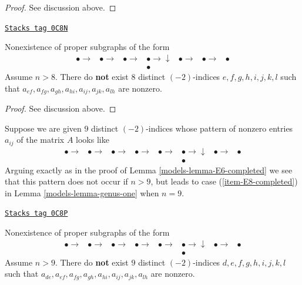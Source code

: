 \begin{proof}
See discussion above.
\end{proof}

\begin{lemma}[E7 completed]
\label{models-lemma-E7-completed}
\href{https://stacks.math.columbia.edu/tag/0C8N}{\texttt{Stacks tag 0C8N}}

Nonexistence of proper subgraphs of the form
$$
\begin{array}{ccccccc}\bullet \longrightarrow & \bullet \longrightarrow & \bullet \longrightarrow & \bullet \longrightarrow\downarrow & \bullet \longrightarrow & \bullet \longrightarrow & \bullet \\  &  &  & \bullet &  &  & \end{array}
$$
Assume $n > 8$. There do {\bf not} exist $8$ distinct
$(-2)$-indices $e, f, g, h, i, j, k, l$
such that $a_{ef}, a_{fg}, a_{gh}, a_{hi}, a_{ij}, a_{jk}, a_{lh}$
are nonzero.
\end{lemma}

\begin{proof}
See discussion above.
\end{proof}

Suppose we are given $9$ distinct $(-2)$-indices whose pattern
of nonzero entries $a_{ij}$ of the matrix $A$ looks like
$$
\begin{array}{cccccccc}\bullet \longrightarrow & \bullet \longrightarrow & \bullet \longrightarrow & \bullet \longrightarrow & \bullet \longrightarrow & \bullet \longrightarrow\downarrow & \bullet \longrightarrow & \bullet \\  &  &  &  &  & \bullet &  & \end{array}
$$
Arguing exactly as in the proof of Lemma \ref{models-lemma-E6-completed}
we see that this pattern does not occur if
$n > 9$, but leads to case (\ref{item-E8-completed})
in Lemma \ref{models-lemma-genus-one} when $n = 9$.

\begin{lemma}[E8 completed]
\label{models-lemma-E8-completed}
\href{https://stacks.math.columbia.edu/tag/0C8P}{\texttt{Stacks tag 0C8P}}

Nonexistence of proper subgraphs of the form
$$
\begin{array}{cccccccc}\bullet \longrightarrow & \bullet \longrightarrow & \bullet \longrightarrow & \bullet \longrightarrow & \bullet \longrightarrow & \bullet \longrightarrow\downarrow & \bullet \longrightarrow & \bullet \\  &  &  &  &  & \bullet &  & \end{array}
$$
Assume $n > 9$. There do {\bf not} exist $9$ distinct
$(-2)$-indices $d, e, f, g, h, i, j, k, l$
such that $a_{de}, a_{ef}, a_{fg}, a_{gh}, a_{hi}, a_{ij}, a_{jk}, a_{lh}$
are nonzero.
\end{lemma}

